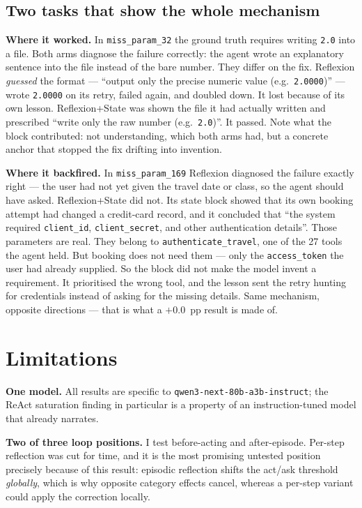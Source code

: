 \documentclass[a4paper, 12pt]{article}
\begin{document}
\subsection{Two tasks that show the whole mechanism}

\textbf{Where it worked.} In \texttt{miss\_param\_32} the ground truth requires
writing \texttt{2.0} into a file. Both arms diagnose the failure correctly: the
agent wrote an explanatory sentence into the file instead of the bare number.
They differ on the fix. Reflexion \emph{guessed} the format --- ``output only
the precise numeric value (e.g.\ \texttt{2.0000})'' --- wrote
\texttt{2.0000} on its retry, failed again, and doubled down. It lost because of
its own lesson. Reflexion+State was shown the file it had actually written and
prescribed ``write only the raw number (e.g.\ \texttt{2.0})''. It passed. Note
what the block contributed: not understanding, which both arms had, but a
concrete anchor that stopped the fix drifting into invention.

\textbf{Where it backfired.} In \texttt{miss\_param\_169} Reflexion diagnosed the
failure exactly right --- the user had not yet given the travel date or class, so
the agent should have asked. Reflexion+State did not. Its state block showed that its own booking attempt
had changed a credit-card record, and it concluded that ``the system required
\texttt{client\_id}, \texttt{client\_secret}, and other authentication details''.
Those parameters are real. They belong to \texttt{authenticate\_travel}, one of the 27 tools the agent held.
But booking does not need them --- only the \texttt{access\_token} the user had already supplied.
So the block did not make the model invent a requirement. It prioritised the wrong tool,
and the lesson sent the retry hunting for credentials instead of asking for the missing details.
Same mechanism, opposite directions --- that is what a $+0.0$~pp result is made of.

\section{Limitations}
\enlargethispage{3\baselineskip}

\textbf{One model.} All results are specific to
\texttt{qwen3-next-80b-a3b-instruct}; the ReAct saturation finding in particular
is a property of an instruction-tuned model that already narrates.

\textbf{Two of three loop positions.} I test before-acting and after-episode.
Per-step reflection was cut for time, and it is the most promising untested
position precisely because of this result: episodic reflection shifts the
act/ask threshold \emph{globally}, which is why opposite category effects
cancel, whereas a per-step variant could apply the correction locally.
\end{document}
